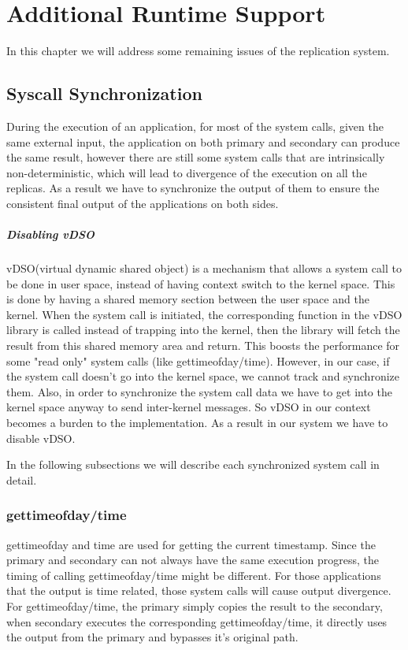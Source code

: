 \chapter{Additional Runtime Support}
In this chapter we will address some remaining issues of the replication system.

\section{Syscall Synchronization}
During the execution of an application, for most of the system calls, given the same external input, the application on both primary and secondary can produce the same result, however there are still some system calls that are intrinsically non-deterministic, which will lead to divergence of the execution on all the replicas. As a result we have to synchronize the output of them to ensure the consistent final output of the applications on both sides.

\paragraph{Disabling vDSO}

vDSO(virtual dynamic shared object) is a mechanism that allows a system call to be done in user space, instead of having context switch to the kernel space. This is done by having a shared memory section between the user space and the kernel. When the system call is initiated, the corresponding function in the vDSO library is called instead of trapping into the kernel, then the library will fetch the result from this shared memory area and return. This boosts the performance for some "read only" system calls (like gettimeofday/time). However, in our case, if the system call doesn't go into the kernel space, we cannot track and synchronize them. Also, in order to synchronize the system call data we have to get into the kernel space anyway to send inter-kernel messages. So vDSO in our context becomes a burden to the implementation. As a result in our system we have to disable vDSO.

In the following subsections we will describe each synchronized system call in detail.

\subsection{gettimeofday/time}

gettimeofday and time are used for getting the current timestamp. Since the primary and secondary can not always have the same execution progress, the timing of calling gettimeofday/time might be different. For those applications that the output is time related, those system calls will cause output divergence. For gettimeofday/time, the primary simply copies the result to the secondary, when secondary executes the corresponding gettimeofday/time, it directly uses the output from the primary and bypasses it's original path.

